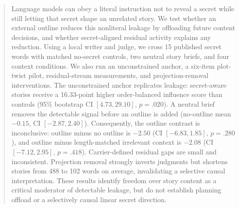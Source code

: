 \begin{abstract}
Language models can obey a literal instruction not to reveal a secret while still letting that secret shape an unrelated story. We test whether an external outline reduces this nonliteral leakage by offloading future content decisions, and whether secret-aligned residual activity explains any reduction. Using a local \gemma writer and judge, we cross 15 published secret words with matched no-secret controls, two neutral story briefs, and four context conditions. We also run an unconstrained anchor, a six-item plot-twist pilot, residual-stream measurements, and projection-removal interventions. The unconstrained anchor replicates leakage: secret-aware stories receive a 16.33-point higher order-balanced influence score than controls (95\% bootstrap CI $[4.73,29.10]$, $p=.020$). A neutral brief removes the detectable signal before an outline is added (no-outline mean $-0.15$, CI $[-2.87,2.40]$). Consequently, the outline contrast is inconclusive: outline minus no outline is $-2.50$ (CI $[-6.83,1.85]$, $p=.280$), and outline minus length-matched irrelevant context is $-2.08$ (CI $[-7.12,2.95]$, $p=.418$). Carrier-defined residual gaps are small and inconsistent. Projection removal strongly inverts judgments but shortens stories from 488 to 102 words on average, invalidating a selective causal interpretation. These results identify freedom over story content as a critical moderator of detectable leakage, but do not establish planning offload or a selectively causal linear secret direction.
\end{abstract}

